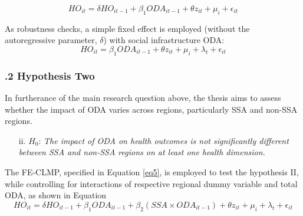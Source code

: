 
\begin{equation}
    HO_{it} = \delta HO_{it-1} + \beta_{1} ODA_{it-1} + \theta z_{it} + \mu_i + \epsilon_{it}
    \label{eq5}
\end{equation}

As robustness checks, a simple fixed effect is employed (without the autoregressive parameter, $\delta$) with social infrastructure ODA:
\begin{equation}
    HO_{it} = \beta_{1} ODA_{it-1} + \theta z_{it} + \mu_i + \lambda_t + \epsilon_{it}
    \label{eq6}
\end{equation}

\subsubsection*{.2 Hypothesis Two}

In furtherance of the main research question above, the thesis aims to assess whether the impact of ODA varies across regions, particularly SSA and non-SSA regions. 
\begin{itemize}
    \item[ii.] \(H_0\): \textit{The impact of ODA on health outcomes is not significantly different between SSA and non-SSA regions on at least one health dimension.}
\end{itemize}
The FE-CLMP, specified in Equation \ref{eq5}, is employed to test the hypothesis II, while controlling for interactions of respective regional dummy variable and total ODA, as shown in Equation 
\begin{equation}
    HO_{it} = \delta HO_{it-1} + \beta_{1} ODA_{it-1} + \beta_2 (SSA\times ODA_{it-1})  + \theta z_{it} + \mu_i + \lambda_t + \epsilon_{it}
    \label{eq7}
\end{equation}




